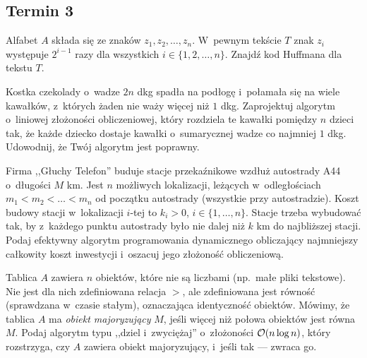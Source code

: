 \subsection{Termin 3}

\begin{zadanie}
	Alfabet $A$ składa się ze znaków $z_1,z_2,\dots,z_n$. W~pewnym tekście $T$
	znak $z_i$ występuje $2^{i-1}$ razy dla wszystkich $i\in\{1,2,\dots,n\}$.
	Znajdź kod Huffmana dla tekstu $T$.
\end{zadanie}

\begin{zadanie}
	Kostka czekolady o~wadze $2n$ dkg spadła na podłogę i~połamała się na wiele
	kawałków, z~których żaden nie waży więcej niż $1$ dkg. Zaprojektuj algorytm
	o~liniowej złożoności obliczeniowej, który rozdziela te kawałki pomiędzy $n$
	dzieci tak, że każde dziecko dostaje kawałki o~sumarycznej wadze co najmniej
	$1$ dkg. Udowodnij, że Twój algorytm jest poprawny.
\end{zadanie}

\begin{zadanie}
	Firma ,,Głuchy Telefon'' buduje stacje przekaźnikowe wzdłuż autostrady A44
	o~długości $M$ km. Jest $n$ możliwych lokalizacji, leżących w~odległościach
	$m_1<m_2<\dots<m_n$ od początku autostrady (wszystkie przy autostradzie).
	Koszt budowy stacji w~lokalizacji $i$-tej to $k_i>0$, $i\in\{1,\dots,n\}$.
	Stacje trzeba wybudować tak, by z~każdego punktu autostrady było nie dalej niż
	$k$ km do najbliższej stacji. Podaj efektywny algorytm programowania
	dynamicznego obliczający najmniejszy całkowity koszt inwestycji i~oszacuj jego
	złożoność obliczeniową.
\end{zadanie}

\begin{zadanie}
	Tablica $A$ zawiera $n$ obiektów, które nie są liczbami (np.\ małe pliki
	tekstowe). Nie jest dla nich zdefiniowana relacja $>$, ale zdefiniowana jest
	równość (sprawdzana w~czasie stałym), oznaczająca identyczność obiektów.
	Mówimy, że tablica $A$ ma \emph{obiekt majoryzujący} $M$, jeśli więcej niż
	połowa obiektów jest równa $M$. Podaj algorytm typu ,,dziel i~zwyciężaj''
	o~złożoności $\mathcal{O}(n\log n)$, który rozstrzyga, czy $A$ zawiera obiekt
	majoryzujący, i~jeśli tak --- zwraca go.
\end{zadanie}
